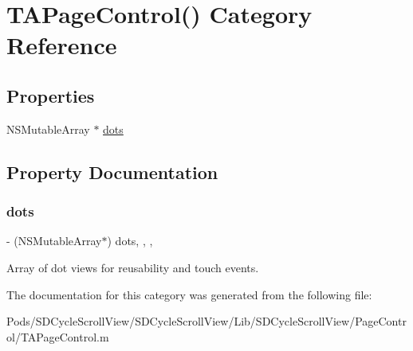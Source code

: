 \hypertarget{category_t_a_page_control_07_08}{}\section{T\+A\+Page\+Control() Category Reference}
\label{category_t_a_page_control_07_08}
\subsection*{Properties}
\begin{DoxyCompactItemize}
\item 
N\+S\+Mutable\+Array $\ast$ \mbox{\hyperlink{category_t_a_page_control_07_08_af3dc5eebec5b27f83148b3a286fa5662}{dots}}
\end{DoxyCompactItemize}


\subsection{Property Documentation}
\mbox{\label{category_t_a_page_control_07_08_af3dc5eebec5b27f83148b3a286fa5662}} 
\subsubsection{\texorpdfstring{dots}{dots}}
{\footnotesize\ttfamily -\/ (N\+S\+Mutable\+Array$\ast$) dots\hspace{0.3cm}{\ttfamily [read]}, {\ttfamily [write]}, {\ttfamily [nonatomic]}, {\ttfamily [strong]}}

Array of dot views for reusability and touch events. 

The documentation for this category was generated from the following file\+:\begin{DoxyCompactItemize}
\item 
Pods/\+S\+D\+Cycle\+Scroll\+View/\+S\+D\+Cycle\+Scroll\+View/\+Lib/\+S\+D\+Cycle\+Scroll\+View/\+Page\+Control/T\+A\+Page\+Control.\+m\end{DoxyCompactItemize}
